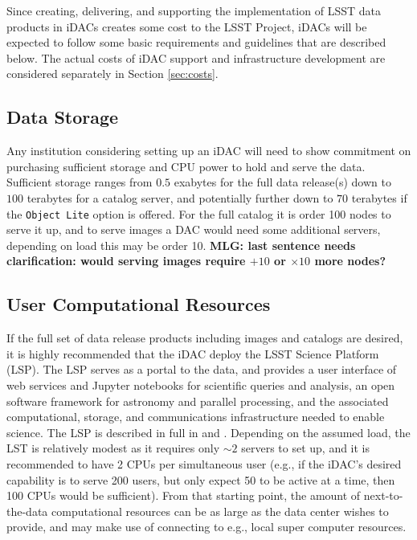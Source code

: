 Since creating, delivering, and supporting the implementation of LSST data products in iDACs creates some cost to the LSST Project, iDACs will be expected to follow some basic requirements and guidelines that are described below. The actual costs of iDAC support and infrastructure development are considered separately in Section \ref{sec:costs}. 

\subsection{Data Storage} 
Any institution considering setting up an iDAC will need to show commitment on purchasing sufficient storage and CPU power to hold and serve the data. Sufficient storage ranges from $0.5$ exabytes for the full data release(s) down to $100$ terabytes for a catalog server, and potentially further down to $70$ terabytes if the {\tt Object Lite} option is offered. For the full catalog it is order 100 nodes to serve it up, and to serve images a DAC would need some additional servers, depending on load this may be order 10. {\bf MLG: last sentence needs clarification: would serving images require $+10$ or $\times10$ more nodes?}

\subsection{User Computational Resources}
If the full set of data release products including images and catalogs are desired, it is highly recommended that the iDAC deploy the LSST Science Platform (LSP). The LSP serves as a portal to the data, and provides a user interface of web services and Jupyter notebooks for scientific queries and analysis, an open software framework for astronomy and parallel processing, and the associated computational, storage, and communications infrastructure needed to enable science. The LSP is described in full in  and . Depending on the assumed load, the LST is relatively modest as it requires only $\sim2$ servers to set up, and it is recommended to have 2 CPUs per simultaneous user (e.g., if the iDAC's desired capability is to serve 200 users, but only expect 50 to be active at a time, then 100 CPUs would be sufficient). From that starting point, the amount of next-to-the-data computational resources can be as large as the data center wishes to provide, and may make use of connecting to e.g., local super computer resources.

